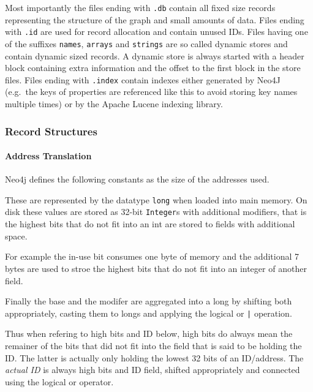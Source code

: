         Most importantly the files ending with \texttt{.db} contain all fixed size records representing the structure of the graph and small amounts of data.
        Files ending with \texttt{.id} are used for record allocation and contain unused IDs. 
        Files having one of the suffixes \texttt{names}, \texttt{arrays} and \texttt{strings} are so called dynamic stores and contain dynamic sized records. 
        A dynamic store is always started with a header block containing extra information and the offset to the first block in the store files. 
        Files ending with \texttt{.index} contain indexes either generated by Neo4J (e.g.\ the keys of properties are referenced like this to avoid storing key names multiple times) or by the Apache Lucene indexing library.
        
        \subsubsection{Record Structures}
            \paragraph{Address Translation}
                Neo4j defines the following constants as the size of the addresses used.
                \begin{figure}[htp]\label{addrsize}
                \end{figure}
                These are represented by the datatype \texttt{long} when loaded into main memory. 
                On disk these values are stored as 32-bit \texttt{Integer}s with additional modifiers, that is the highest bits that do not fit into an int are stored to fields with additional space.
                
                For example the in-use bit consumes one byte of memory and the additional 7 bytes are used to stroe the highest bits that do not fit into an integer of another field.
                
                Finally the base and the modifer are aggregated into a long by shifting both appropriately, casting them to longs and applying the logical or \texttt{|} operation.
                
                Thus when refering to high bits and ID below, high bits do always mean the remainer of the bits that did not fit into the field that is said to be holding the ID\@.
                The latter is actually only holding the lowest 32 bits of an ID/address. The \textit{actual ID} is always high bits and ID field, shifted appropriately and connected using the logical or operator.
                
